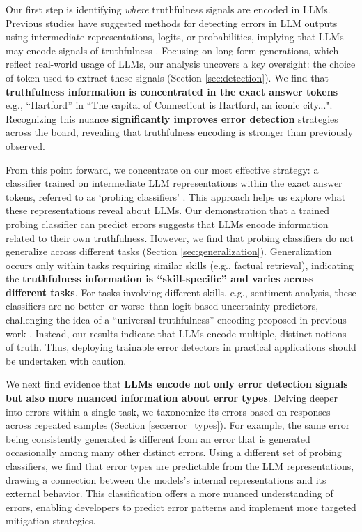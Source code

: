 Our first step is identifying \textit{where} truthfulness signals are encoded in LLMs.
Previous studies have suggested methods for detecting errors in LLM outputs using intermediate representations, logits, or probabilities, implying that LLMs may encode signals of truthfulness \citep{kadavath2022language, li2024inference, chen2024inside}. 
Focusing on long-form generations, which reflect real-world usage of LLMs, our analysis uncovers a key oversight: the choice of token used to extract these signals (Section \ref{sec:detection}).
We find that \textbf{truthfulness information is concentrated in the exact answer tokens} -- e.g., “Hartford” in “The capital of Connecticut is Hartford, an iconic city...".
Recognizing this nuance \textbf{significantly improves error detection} strategies across the board, revealing that truthfulness encoding is stronger than previously observed.

From this point forward, we concentrate on our most effective strategy: a classifier trained on intermediate LLM representations within the exact answer tokens, referred to as `probing classifiers' \citep{belinkov2021probingclassifierspromisesshortcomings}.
This approach helps us explore what these representations reveal about LLMs.
Our demonstration that a trained probing classifier can predict errors suggests that LLMs encode information related to their own truthfulness.
However, we find that probing classifiers do not generalize across different tasks (Section \ref{sec:generalization}).
Generalization occurs only within tasks requiring similar skills (e.g., factual retrieval), indicating the \textbf{truthfulness information is ``skill-specific'' and varies across different tasks}.
For tasks involving different skills, e.g., sentiment analysis, these classifiers are no better--or worse--than logit-based uncertainty predictors, challenging the idea of a ``universal truthfulness'' encoding proposed in previous work \citep{marks2023geometry,slobodkin-etal-2023-curious}.
Instead, our results indicate that LLMs encode multiple, distinct notions of truth.
Thus, deploying trainable error detectors in practical applications should be undertaken with caution.

We next find evidence that \textbf{LLMs encode not only error detection signals but also more nuanced information about error types}.
Delving deeper into errors within a single task, we taxonomize its errors based on responses across repeated samples (Section \ref{sec:error_types}).
For example, the same error being consistently generated is different from an error that is generated occasionally among many other distinct errors.
Using a different set of probing classifiers, we find that error types are predictable from the LLM representations, drawing a connection between the models's internal representations and its external behavior.
This classification offers a more nuanced understanding of errors, enabling developers to predict error patterns and implement more targeted mitigation strategies.

